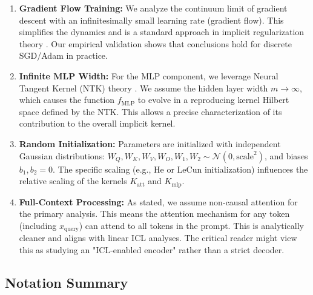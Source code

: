 \begin{enumerate}
	\item \textbf{Gradient Flow Training:} We analyze the continuum limit of gradient descent with an infinitesimally small learning rate (gradient flow). This simplifies the dynamics and is a standard approach in implicit regularization theory \citep{ji2020gradient}. Our empirical validation shows that conclusions hold for discrete SGD/Adam in practice.
	\item \textbf{Infinite MLP Width:} For the MLP component, we leverage Neural Tangent Kernel (NTK) theory \citep{jacot2018neural}. We assume the hidden layer width \( m \to \infty \), which causes the function \( f_{\text{MLP}} \) to evolve in a reproducing kernel Hilbert space defined by the NTK. This allows a precise characterization of its contribution to the overall implicit kernel.
	\item \textbf{Random Initialization:} Parameters are initialized with independent Gaussian distributions: \( W_Q, W_K, W_V, W_O, W_1, W_2 \sim \mathcal{N}(0, \text{scale}^2) \), and biases \( b_1, b_2 = 0 \). The specific scaling (e.g., He or LeCun initialization) influences the relative scaling of the kernels \( K_{\text{att}} \) and \( K_{\text{mlp}} \).
	\item \textbf{Full-Context Processing:} As stated, we assume non-causal attention for the primary analysis. This means the attention mechanism for any token (including \( x_{\text{query}} \)) can attend to all tokens in the prompt. This is analytically cleaner and aligns with linear ICL analyses. The critical reader might view this as studying an "ICL-enabled encoder" rather than a strict decoder.
\end{enumerate}

\subsection{Notation Summary}
\label{subsec:notation}

